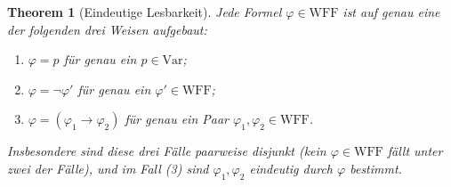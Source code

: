 \documentclass[12pt, a4paper]{article}
\newtheorem{theorem}{Theorem}[section]
\theoremstyle{definition}
\theoremstyle{remark}
\newcommand{\WFF}{\mathrm{WFF}}
\newcommand{\Var}{\mathrm{Var}}
\begin{document}
\begin{theorem}[Eindeutige Lesbarkeit]
\label{thm:eindeutige_lesbarkeit}
Jede Formel $\varphi \in \WFF$ ist auf genau eine der folgenden drei Weisen aufgebaut:
\begin{enumerate}[label=(\arabic*)]
  \item $\varphi = p$ für genau ein $p \in \Var$;
  \item $\varphi = \neg\varphi'$ für genau ein $\varphi' \in \WFF$;
  \item $\varphi = (\varphi_1 \to \varphi_2)$ für genau ein Paar $\varphi_1, \varphi_2 \in \WFF$.
\end{enumerate}
Insbesondere sind diese drei Fälle paarweise disjunkt (kein $\varphi \in \WFF$ fällt unter zwei der Fälle), und im Fall (3) sind $\varphi_1, \varphi_2$ eindeutig durch $\varphi$ bestimmt.
\end{theorem}
\end{document}

